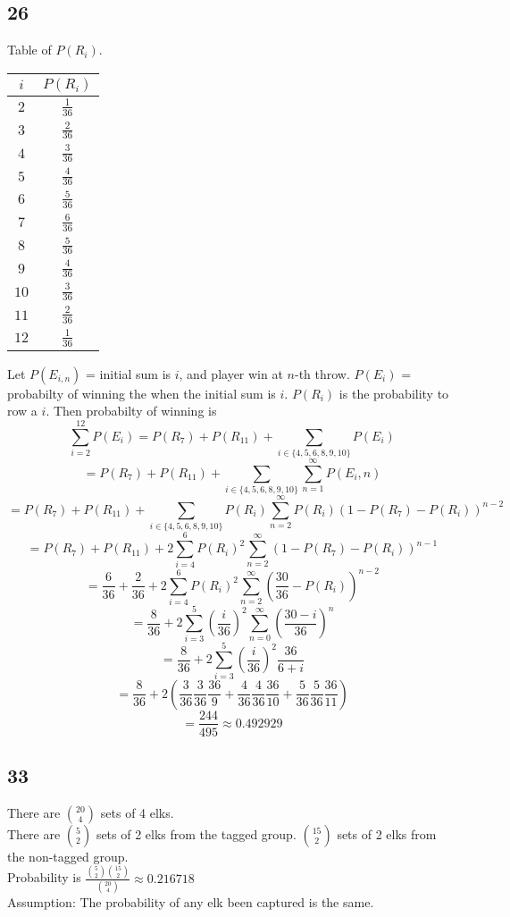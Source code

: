 \documentclass[letter]{article}
\begin{document}
\subsection*{26}
Table of $P(R_i)$.
\begin{tabular}{|c|c|}
\hline
$i$&$P(R_i)$\\
\hline
$2$&$\frac{1}{36}$\\
\hline
$3$&$\frac{2}{36}$\\
\hline
$4$&$\frac{3}{36}$\\
\hline
$5$&$\frac{4}{36}$\\
\hline
$6$&$\frac{5}{36}$\\
\hline
$7$&$\frac{6}{36}$\\
\hline
$8$&$\frac{5}{36}$\\
\hline
$9$&$\frac{4}{36}$\\
\hline
$10$&$\frac{3}{36}$\\
\hline
$11$&$\frac{2}{36}$\\
\hline
$12$&$\frac{1}{36}$\\
\hline
\end{tabular}

Let $P(E_{i,n})$ = initial sum is $i$, and player win at $n$-th throw. $P(E_i)$ = probabilty of winning the when the initial sum is $i$. $P(R_i)$ is the probability to row a $i$.
Then probabilty of winning is\\
\[\sum_{i=2}^{12} P(E_i) = P(R_7)+P(R_{11}) + \sum_{i\in\{4,5,6,8,9,10\}} P(E_i)\]
\[= P(R_7)+P(R_{11}) + \sum_{i\in\{4,5,6,8,9,10\}} \sum_{n=1}^\infty P(E_i,n)\]
\[= P(R_7)+P(R_{11}) + \sum_{i\in\{4,5,6,8,9,10\}} P(R_i)\sum_{n=2}^\infty P(R_i)(1-P(R_7)-P(R_i))^{n-2}\]
\[= P(R_7)+P(R_{11}) + 2\sum_{i=4}^6 P(R_i)^2 \sum_{n=2}^\infty (1-P(R_7)-P(R_i))^{n-1}\]
\[=\frac{6}{36}+\frac{2}{36}+2\sum_{i=4}^6 P(R_i)^2\sum_{n=2}^\infty (\frac{30}{36}-P(R_i))^{n-2}\]
\[=\frac{8}{36}+2\sum_{i=3}^5 (\frac{i}{36})^2 \sum_{n=0}^\infty (\frac{30-i}{36})^{n}\]
\[=\frac{8}{36}+2\sum_{i=3}^5 (\frac{i}{36})^2\frac{36}{6+i}\]
\[=\frac{8}{36}+2(\frac{3}{36}\frac{3}{36}\frac{36}{9} + \frac{4}{36}\frac{4}{36}\frac{36}{10} + \frac{5}{36}\frac{5}{36}\frac{36}{11})\]
\[=\frac{244}{495}\approx 0.492929\]
\subsection*{33}
There are ${20\choose 4}$ sets of 4 elks.\\
There are ${5 \choose 2}$ sets of 2 elks from the tagged group. ${15 \choose 2}$ sets of 2 elks from the non-tagged group.\\
Probability is $\frac{{5 \choose 2}{15\choose 2}}{{20\choose 4}}\approx 0.216718$\\
Assumption: The probability of any elk been captured is the same.
\end{document}
